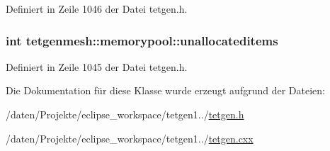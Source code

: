 Definiert in Zeile 1046 der Datei tetgen.\-h.

\hypertarget{classtetgenmesh_1_1memorypool_aa8a5667ab1f55ec7ef852d378871b9ee}{
\subsubsection[{unallocateditems}]{\setlength{\rightskip}{0pt plus 5cm}int tetgenmesh\-::memorypool\-::unallocateditems}}\label{classtetgenmesh_1_1memorypool_aa8a5667ab1f55ec7ef852d378871b9ee}


Definiert in Zeile 1045 der Datei tetgen.\-h.



Die Dokumentation für diese Klasse wurde erzeugt aufgrund der Dateien\-:\begin{DoxyCompactItemize}
\item 
/daten/\-Projekte/eclipse\-\_\-workspace/tetgen1../\hyperlink{tetgen_8h}{tetgen.\-h}\item 
/daten/\-Projekte/eclipse\-\_\-workspace/tetgen1../\hyperlink{tetgen_8cxx}{tetgen.\-cxx}\end{DoxyCompactItemize}
